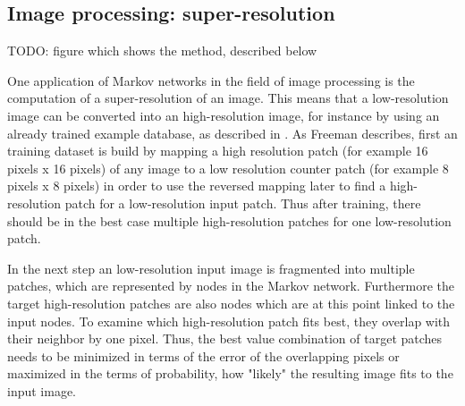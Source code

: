 \subsection{Image processing: super-resolution}
\label{sec:image}

TODO: figure which shows the method, described below

One application of Markov networks in the field of image processing is the computation of a super-resolution of an image. This means that a low-resolution image can be converted into an high-resolution image, for instance by using an already trained example database, as described in \cite{freeman2002example}. As Freeman describes, first an training dataset is build by mapping a high resolution patch (for example 16 pixels x 16 pixels) of any image to a low resolution counter patch (for example 8 pixels x 8 pixels) in order to use the reversed mapping later to find a high-resolution patch for a low-resolution input patch. Thus after training, there should be in the best case multiple high-resolution patches for one low-resolution patch.

In the next step an low-resolution input image is fragmented into multiple patches, which are represented by nodes in the Markov network. Furthermore the target high-resolution patches are also nodes which are at this point linked to the input nodes. To examine which high-resolution patch fits best, they overlap with their neighbor by one pixel. Thus, the best value combination of target patches needs to be minimized in terms of the error of the overlapping pixels or maximized in the terms of probability, how "likely" the resulting image fits to the input image.
